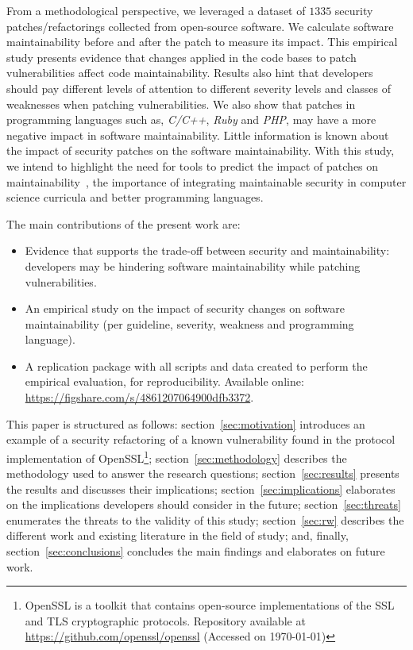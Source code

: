 \documentclass[10pt,conference]{IEEEtran}
\begin{document}
From a methodological 
perspective, we leveraged a dataset of $1335$ security patches/refactorings collected from open-source 
software. We calculate software maintainability before and after the patch to measure its 
impact. This empirical study presents evidence that changes 
applied in the code bases to patch vulnerabilities affect code maintainability.
Results also hint that developers should pay different levels of attention 
to different severity levels and classes of weaknesses when patching vulnerabilities. We also
show that patches in programming languages such as, \emph{C/C++}, \emph{Ruby} and \emph{PHP}, 
may have a more negative impact in software maintainability.
Little information is known about the impact of security patches on the software
maintainability. With this study, 
we intend to highlight the need for tools to predict the impact of patches on 
maintainability~\cite{4724577}, the importance of integrating
maintainable security in computer science curricula and better programming languages.
%
%

The main contributions of the present work are:
%
\begin{itemize}
  \item Evidence that supports the trade-off between security and maintainability:
  developers may be hindering software maintainability while patching vulnerabilities.
	\item An empirical study on the impact of security changes on software
  maintainability (per guideline, severity, weakness and programming language).
	\item A replication package with all scripts and data created to perform the
	empirical evaluation, for reproducibility. Available online:
  \url{https://figshare.com/s/4861207064900dfb3372}.
\end{itemize}
%
This paper is structured as follows: section~\ref{sec:motivation} introduces an
example of a security refactoring of a known vulnerability found in the
protocol implementation of OpenSSL\footnote{\label{openssl}OpenSSL is a toolkit that
contains open-source implementations of the SSL and TLS cryptographic
protocols. Repository available at \url{https://github.com/openssl/openssl}
(Accessed on \today{})}; section~\ref{sec:methodology} describes the
methodology used to answer the research questions; section~\ref{sec:results}
presents the results and discusses their
implications; section~\ref{sec:implications} elaborates on the implications
developers should consider in the future; section~\ref{sec:threats} enumerates the threats to the validity of
this study; section~\ref{sec:rw} describes the different work and existing
literature in the field of study; and, finally, section~\ref{sec:conclusions}
concludes the main findings and elaborates on future work.
%
\end{document}
